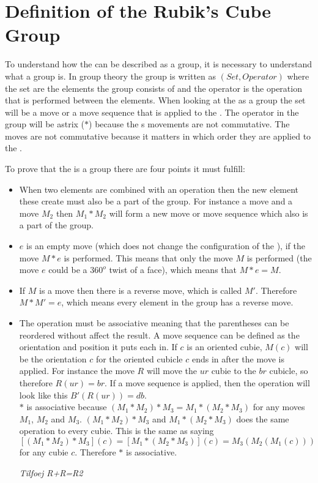\section{Definition of the Rubik's Cube Group}
\label{sec:groupDefinition}
To understand how the \rubik{} can be described as a group, it is necessary to understand what a group is.
In group theory the group is written as $(Set, Operator)$ where the set are the elements the group consists of and the operator is the operation that is performed between the elements. When looking at the \rubik{} as a group the set will be a move or a move sequence that is applied to the \rubik{}. The operator in the \rubik{} group will be astrix ($*$) because the \rubik{}s movements are not commutative. The moves are not commutative because it matters in which order they are applied to the \rubik{}\cite[p. 157]{Rubik87}.

To prove that the \rubik{} is a group there are four points it must fulfill:

\begin {itemize}
\item When two elements are combined with an operation then the new element these create must also be a part of the group. For instance a move  and a move $M_2$ then $M_1 * M_2$ will form a new move or move sequence which also is a part of the group.

\item $e$ is an empty move (which does not change the configuration of the \rubik{}), if the move $M * e$ is performed. This means that only the move $M$ is performed (the move $e$ could be a $360^o$ twist of a face), which means that $M*e=M$.

\item If $M$ is a move then there is a reverse move, which is called $M'$. Therefore $M*M' = e$, which means every element in the group has a reverse move.

\item The operation must be associative meaning that the parentheses can be reordered without affect the result. A move sequence can be defined as the orientation and position it puts each \cpiece{} in. If $c$ is an oriented  cubie, $M(c)$ will be the orientation $c$ for the oriented cubicle $c$ ends in after the move is applied. For instance the move $R$ will move the $ur$ cubie to the $br$ cubicle, so therefore $R(ur)=br$. If a move sequence is applied, then the operation will look like this $B'(R(ur))=db$.\\
$*$ is associative because $(M_1 *M_2 )*M_3 = M_1 *(M_2 *M_3 )$ for any moves $M_1$, $M_2$ and $M_3$. $(M_1 *M_2 )*M_3$ and $M_1 *(M_2 *M_3 )$ does the same operation to every cubie. This is the same as saying $[(M_1 *M_2 )*M_3 ](c)=[M_1 *(M_2 *M_3 )](c)=M_3 (M_2 (M_1 (c)))$ for any cubie $c$. Therefore $*$ is associative.

\emph{Tilfoej R+R=R2}

\end {itemize}

